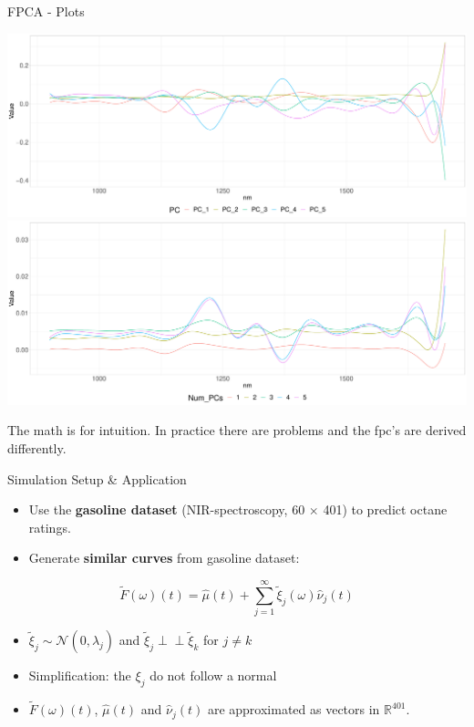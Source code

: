 \documentclass{beamer}
\newcommand{\independent}{\perp\!\!\!\!\perp}
\begin{document}
	\begin{frame}{FPCA - Plots}
		\begin{minipage}[c]{0.78\textwidth}
			\includegraphics[width = \textwidth]{../Graphics/principal_components.pdf}
			\includegraphics[width = \textwidth]{../Graphics/pc_approx.pdf}
		\end{minipage}
		\begin{minipage}[c]{0.19\textwidth}
			The math is for intuition. In practice there are problems and the fpc's are derived differently.
		\end{minipage}
	\end{frame}
	

	\begin{frame}{Simulation Setup \& Application}
		\begin{itemize}
			\item Use the \textbf{gasoline dataset} (NIR-spectroscopy, 60 $\times$ 401) to predict octane ratings.
			\item Generate \textbf{similar curves} from gasoline dataset:
		\end{itemize}
	
		$$\tilde{F}(\omega)(t) = \hat{\mu}(t) + \sum_{j = 1}^{\infty} \tilde{\xi}_j(\omega) \hat{\nu}_j(t)$$ 

		\begin{itemize}
			\item $\tilde{\xi}_{j} \sim \mathcal{N}(0,\hat{\lambda}_j)$ and $\tilde{\xi}_{j} \independent \tilde{\xi}_{k}$ for $j \neq k$
			\item Simplification: the $\xi_{j}$ do not follow a normal
			\item $\tilde{F}(\omega)(t)$, $\hat{\mu}(t)$ and $\hat{\nu}_j(t)$ are approximated as vectors in $\mathbb{R}^{401}$.
		\end{itemize}
		
	\end{frame}
	
\end{document}

